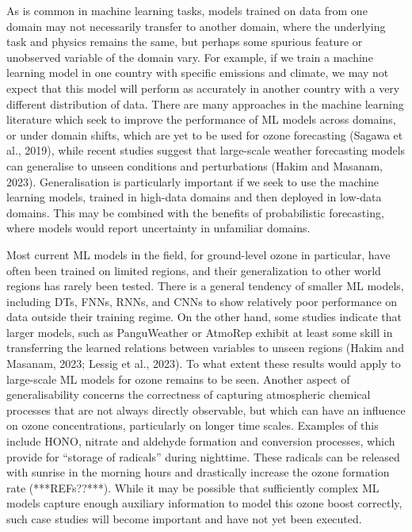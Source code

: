 \documentclass[gmd, manuscript]{copernicus}
\begin{document}
As is common in machine learning tasks, models trained on data from one domain may not necessarily transfer to another domain, where the underlying task and physics remains the same, but perhaps some spurious feature or unobserved variable of the domain vary. For example, if we train a machine learning model in one country with specific emissions and climate, we may not expect that this model will perform as accurately in another country with a very different distribution of data. There are many approaches in the machine learning literature which seek to improve the performance of ML models across domains, or under domain shifts, which are yet to be used for ozone forecasting (Sagawa et al., 2019), while recent studies suggest that large-scale weather forecasting models can generalise to unseen conditions and perturbations (Hakim and Masanam, 2023). Generalisation is particularly important if we seek to use the machine learning models, trained in high-data domains and then deployed in low-data domains. This may be combined with the benefits of probabilistic forecasting, where models would report uncertainty in unfamiliar domains.

Most current ML models in the field, for ground-level ozone in particular, have often been trained on limited regions, and their generalization to other world regions has rarely been tested. There is a general tendency of smaller ML models, including DTs, FNNs, RNNs, and CNNs to show relatively poor performance on data outside their training regime. On the other hand, some studies indicate that larger models, such as PanguWeather or AtmoRep exhibit at least some skill in transferring the learned relations between variables to unseen regions (Hakim and Masanam, 2023; Lessig et al., 2023). To what extent these results would apply to large-scale ML models for ozone remains to be seen. Another aspect of generalisability concerns the correctness of capturing atmospheric chemical processes that are not always directly observable, but which can have an influence on ozone concentrations, particularly on longer time scales. Examples of this include HONO, nitrate and aldehyde formation and conversion processes, which provide for “storage of radicals” during nighttime. These radicals can be released with sunrise in the morning hours and drastically increase the ozone formation rate (***REFs??***). While it may be possible that sufficiently complex ML models capture enough auxiliary information to model this ozone boost correctly, such case studies will become important and have not yet been executed. 
\end{document}
